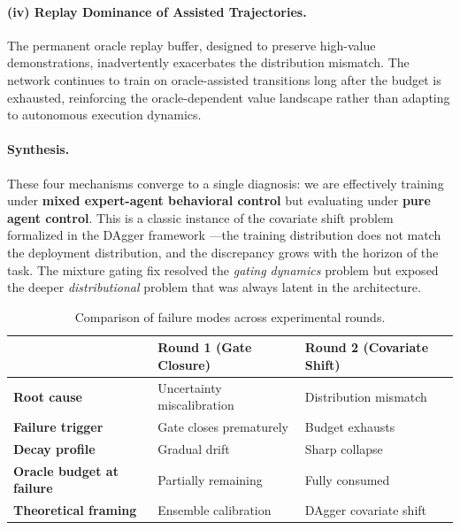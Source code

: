 \documentclass[11pt, a4paper]{article}
\begin{document}
\paragraph{(iv) Replay Dominance of Assisted Trajectories.}
The permanent oracle replay buffer, designed to preserve high-value demonstrations, inadvertently exacerbates the distribution mismatch. The network continues to train on oracle-assisted transitions long after the budget is exhausted, reinforcing the oracle-dependent value landscape rather than adapting to autonomous execution dynamics.

\paragraph{Synthesis.}
These four mechanisms converge to a single diagnosis: we are effectively training under \textbf{mixed expert-agent behavioral control} but evaluating under \textbf{pure agent control}. This is a classic instance of the covariate shift problem formalized in the DAgger framework \cite{ross2011reduction}---the training distribution does not match the deployment distribution, and the discrepancy grows with the horizon of the task. The mixture gating fix resolved the \textit{gating dynamics} problem but exposed the deeper \textit{distributional} problem that was always latent in the architecture.

\begin{table}[h]
    \centering
    \caption{Comparison of failure modes across experimental rounds.}
    \label{tab:failure_comparison}
    \begin{tabular}{@{} l l l @{}}
        \toprule
        & \textbf{Round 1 (Gate Closure)} & \textbf{Round 2 (Covariate Shift)} \\
        \midrule
        \textbf{Root cause} & Uncertainty miscalibration & Distribution mismatch \\
        \textbf{Failure trigger} & Gate closes prematurely & Budget exhausts \\
        \textbf{Decay profile} & Gradual drift & Sharp collapse \\
        \textbf{Oracle budget at failure} & Partially remaining & Fully consumed \\
        \textbf{Theoretical framing} & Ensemble calibration & DAgger covariate shift \\
        \bottomrule
    \end{tabular}
\end{table}
\end{document}
